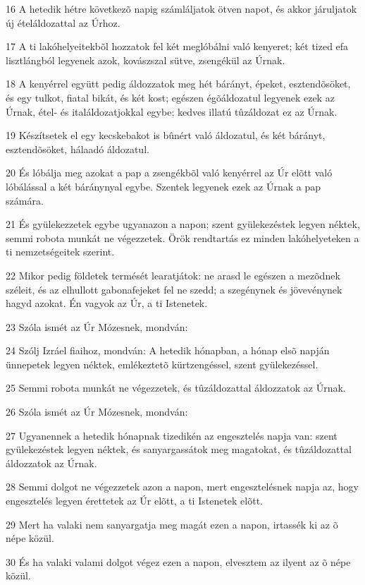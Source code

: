 \par 16 A hetedik hétre következõ napig számláljatok ötven napot, és akkor járuljatok új ételáldozattal az Úrhoz.
\par 17 A ti lakóhelyeitekbõl hozzatok fel két meglóbálni való kenyeret; két tized efa lisztlángból legyenek azok, kovászszal sütve, zsengékül az Úrnak.
\par 18 A kenyérrel együtt pedig áldozzatok meg hét bárányt, épeket, esztendõsöket, és egy tulkot, fiatal bikát, és két kost; egészen égõáldozatul legyenek ezek az Úrnak, étel- és italáldozatjokkal egybe; kedves illatú tûzáldozat ez az Úrnak.
\par 19 Készítsetek el egy kecskebakot is bûnért való áldozatul, és két bárányt, esztendõsöket, hálaadó áldozatul.
\par 20 És lóbálja meg azokat a pap a zsengékbõl való kenyérrel az Úr elõtt való lóbálással a két báránynyal egybe. Szentek legyenek ezek az Úrnak a pap számára.
\par 21 És gyülekezzetek egybe ugyanazon a napon; szent gyülekezéstek legyen néktek, semmi robota munkát ne végezzetek. Örök rendtartás ez minden lakóhelyeteken a ti nemzetségeitek szerint.
\par 22 Mikor pedig földetek termését learatjátok: ne arasd le egészen a mezõdnek széleit, és az elhullott gabonafejeket fel ne szedd; a szegénynek és jövevénynek hagyd azokat. Én vagyok az Úr, a ti Istenetek.
\par 23 Szóla ismét az Úr Mózesnek, mondván:
\par 24 Szólj Izráel fiaihoz, mondván: A hetedik hónapban, a hónap elsõ napján ünnepetek legyen néktek, emlékeztetõ kürtzengéssel, szent gyülekezéssel.
\par 25 Semmi robota munkát ne végezzetek, és tûzáldozattal áldozzatok az Úrnak.
\par 26 Szóla ismét az Úr Mózesnek, mondván:
\par 27 Ugyanennek a hetedik hónapnak tizedikén az engesztelés napja van: szent gyülekezéstek legyen néktek, és sanyargassátok meg magatokat, és tûzáldozattal áldozzatok az Úrnak.
\par 28 Semmi dolgot ne végezzetek azon a napon, mert engesztelésnek napja az, hogy engesztelés legyen érettetek az Úr elõtt, a ti Istenetek elõtt.
\par 29 Mert ha valaki nem sanyargatja meg magát ezen a napon, irtassék ki az õ népe közül.
\par 30 És ha valaki valami dolgot végez ezen a napon, elvesztem az ilyent az õ népe közül.
